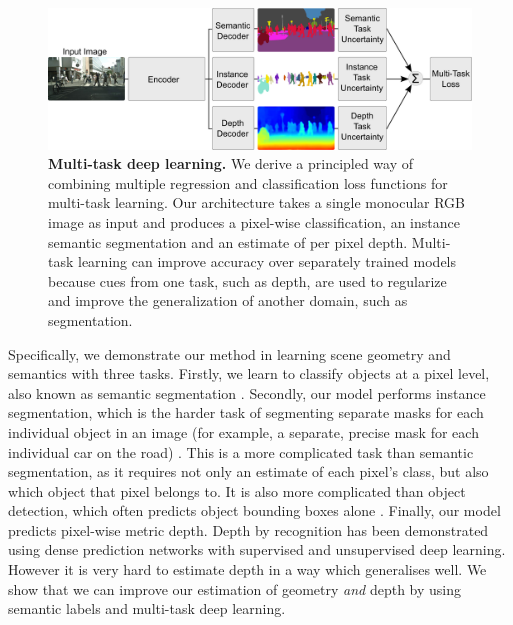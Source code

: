 \begin{figure}[t]
\begin{center}
		\includegraphics[width=\linewidth]{figures/multitask-architecture.pdf}    
\end{center}
   \caption[Multi-task deep learning for scene understanding.]{\textbf{Multi-task deep learning.} We derive a principled way of combining multiple regression and classification loss functions for multi-task learning. Our architecture takes a single monocular RGB image as input and produces a pixel-wise classification, an instance semantic segmentation and an estimate of per pixel depth. Multi-task learning can improve accuracy over separately trained models because cues from one task, such as depth, are used to regularize and improve the generalization of another domain, such as segmentation.}
\label{fig:teaser}
\end{figure}

Specifically, we demonstrate our method in learning scene geometry and semantics with three tasks. Firstly, we learn to classify objects at a pixel level, also known as semantic segmentation \citep{long2015fully,badrinarayanan2017segnet,YuKoltun2016,chen2016deeplab,CRFRNN}. Secondly, our model performs instance segmentation, which is the harder task of segmenting separate masks for each individual object in an image (for example, a separate, precise mask for each individual car on the road) \citep{pinheiro2015learning,hariharan2015hypercolumns,dai2016instance,bai2016deep}. This is a more complicated task than semantic segmentation, as it requires not only an estimate of each pixel's class, but also which object that pixel belongs to. It is also more complicated than object detection, which often predicts object bounding boxes alone \citep{girshick2014rich}. Finally, our model predicts pixel-wise metric depth. Depth by recognition has been demonstrated using dense prediction networks with supervised \citep{eigen2015predicting} and unsupervised \citep{garg2016unsupervised} deep learning. However it is very hard to estimate depth in a way which generalises well. We show that we can improve our estimation of geometry \textit{and} depth by using semantic labels and multi-task deep learning.


